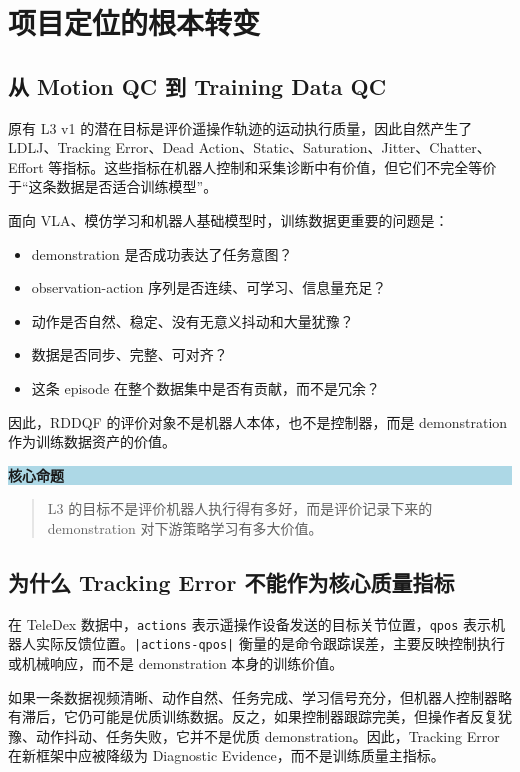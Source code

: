 \documentclass[UTF8,zihao=-4,oneside,openany]{ctexrep}
\newcommand{\Code}[1]{\texttt{#1}}
\newenvironment{notebox}[1]{\vspace{0.5em}\noindent\colorbox{LightBlue}{\parbox{0.96\linewidth}{\textbf{#1}}}\par\vspace{-0.2em}\begin{quote}\small}{\end{quote}\vspace{0.3em}}
\begin{document}
\section{项目定位的根本转变}

\subsection{从 Motion QC 到 Training Data QC}

原有 L3 v1 的潜在目标是评价遥操作轨迹的运动执行质量，因此自然产生了 LDLJ、Tracking Error、Dead Action、Static、Saturation、Jitter、Chatter、Effort 等指标。这些指标在机器人控制和采集诊断中有价值，但它们不完全等价于“这条数据是否适合训练模型”。

面向 VLA、模仿学习和机器人基础模型时，训练数据更重要的问题是：

\begin{itemize}
\item demonstration 是否成功表达了任务意图？
\item observation-action 序列是否连续、可学习、信息量充足？
\item 动作是否自然、稳定、没有无意义抖动和大量犹豫？
\item 数据是否同步、完整、可对齐？
\item 这条 episode 在整个数据集中是否有贡献，而不是冗余？
\end{itemize}

因此，RDDQF 的评价对象不是机器人本体，也不是控制器，而是 demonstration 作为训练数据资产的价值。

\begin{notebox}{核心命题}
L3 的目标不是评价机器人执行得有多好，而是评价记录下来的 demonstration 对下游策略学习有多大价值。
\end{notebox}

\subsection{为什么 Tracking Error 不能作为核心质量指标}

在 TeleDex 数据中，\Code{actions} 表示遥操作设备发送的目标关节位置，\Code{qpos} 表示机器人实际反馈位置。\Code{|actions-qpos|} 衡量的是命令跟踪误差，主要反映控制执行或机械响应，而不是 demonstration 本身的训练价值。

如果一条数据视频清晰、动作自然、任务完成、学习信号充分，但机器人控制器略有滞后，它仍可能是优质训练数据。反之，如果控制器跟踪完美，但操作者反复犹豫、动作抖动、任务失败，它并不是优质 demonstration。因此，Tracking Error 在新框架中应被降级为 Diagnostic Evidence，而不是训练质量主指标。
\end{document}
